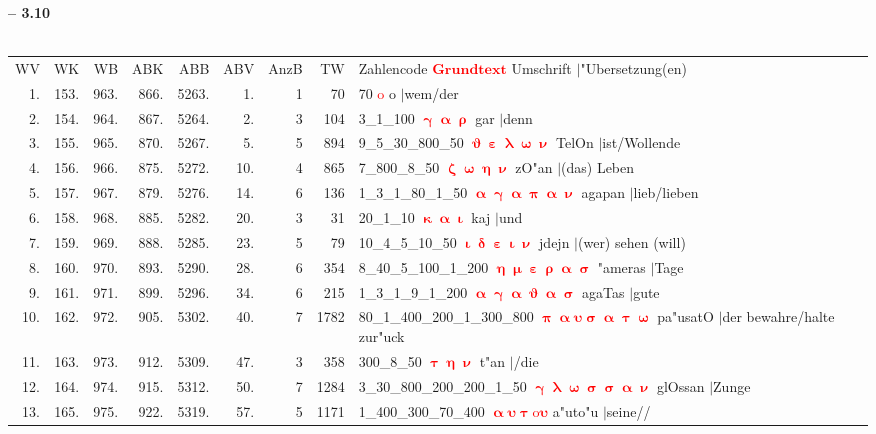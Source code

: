 \documentclass[a4paper,10pt,landscape]{article}
\begin{document}
\newpage 
{\bf -- 3.10}\\
\medskip \\
\begin{tabular}{rrrrrrrrp{120mm}}
WV&WK&WB&ABK&ABB&ABV&AnzB&TW&Zahlencode \textcolor{red}{$\boldsymbol{Grundtext}$} Umschrift $|$"Ubersetzung(en)\\
1.&153.&963.&866.&5263.&1.&1&70&70 \textcolor{red}{$\boldsymbol{\mathrm{o}}$} o $|$wem/der\\
2.&154.&964.&867.&5264.&2.&3&104&3\_1\_100 \textcolor{red}{$\boldsymbol{\upgamma\upalpha\uprho}$} gar $|$denn\\
3.&155.&965.&870.&5267.&5.&5&894&9\_5\_30\_800\_50 \textcolor{red}{$\boldsymbol{\upvartheta\upepsilon\uplambda\upomega\upnu}$} TelOn $|$ist/Wollende\\
4.&156.&966.&875.&5272.&10.&4&865&7\_800\_8\_50 \textcolor{red}{$\boldsymbol{\upzeta\upomega\upeta\upnu}$} zO"an $|$(das) Leben\\
5.&157.&967.&879.&5276.&14.&6&136&1\_3\_1\_80\_1\_50 \textcolor{red}{$\boldsymbol{\upalpha\upgamma\upalpha\uppi\upalpha\upnu}$} agapan $|$lieb/lieben\\
6.&158.&968.&885.&5282.&20.&3&31&20\_1\_10 \textcolor{red}{$\boldsymbol{\upkappa\upalpha\upiota}$} kaj $|$und\\
7.&159.&969.&888.&5285.&23.&5&79&10\_4\_5\_10\_50 \textcolor{red}{$\boldsymbol{\upiota\updelta\upepsilon\upiota\upnu}$} jdejn $|$(wer) sehen (will)\\
8.&160.&970.&893.&5290.&28.&6&354&8\_40\_5\_100\_1\_200 \textcolor{red}{$\boldsymbol{\upeta\upmu\upepsilon\uprho\upalpha\upsigma}$} "ameras $|$Tage\\
9.&161.&971.&899.&5296.&34.&6&215&1\_3\_1\_9\_1\_200 \textcolor{red}{$\boldsymbol{\upalpha\upgamma\upalpha\upvartheta\upalpha\upsigma}$} agaTas $|$gute\\
10.&162.&972.&905.&5302.&40.&7&1782&80\_1\_400\_200\_1\_300\_800 \textcolor{red}{$\boldsymbol{\uppi\upalpha\upsilon\upsigma\upalpha\uptau\upomega}$} pa"usatO $|$der bewahre/halte zur"uck\\
11.&163.&973.&912.&5309.&47.&3&358&300\_8\_50 \textcolor{red}{$\boldsymbol{\uptau\upeta\upnu}$} t"an $|$/die\\
12.&164.&974.&915.&5312.&50.&7&1284&3\_30\_800\_200\_200\_1\_50 \textcolor{red}{$\boldsymbol{\upgamma\uplambda\upomega\upsigma\upsigma\upalpha\upnu}$} glOssan $|$Zunge\\
13.&165.&975.&922.&5319.&57.&5&1171&1\_400\_300\_70\_400 \textcolor{red}{$\boldsymbol{\upalpha\upsilon\uptau\mathrm{o}\upsilon}$} a"uto"u $|$seine//\\

\end{tabular}
\end{document}
